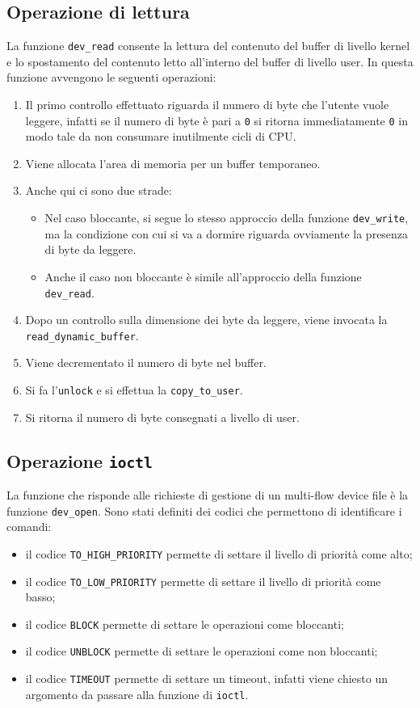 \documentclass[oneside]{article}
\begin{document}
\subsection{Operazione di lettura}
La funzione \texttt{dev\_read} consente la lettura del contenuto del buffer di livello kernel e lo spostamento del contenuto letto all'interno del buffer di livello user. In questa funzione avvengono le seguenti operazioni:
\begin{enumerate}
\item Il primo controllo effettuato riguarda il numero di byte che l'utente vuole leggere, infatti se il numero di byte è pari a \texttt{0} si ritorna immediatamente \texttt{0} in modo tale da non consumare inutilmente cicli di CPU.
\item Viene allocata l'area di memoria per un buffer temporaneo.
\item Anche qui ci sono due strade:
\begin{itemize}
\item Nel caso bloccante, si segue lo stesso approccio della funzione \texttt{dev\_write}, ma la condizione con cui si va a dormire riguarda ovviamente la presenza di byte da leggere.
\item Anche il caso non bloccante è simile all'approccio della funzione \texttt{dev\_read}.
\end{itemize}
\item Dopo un controllo sulla dimensione dei byte da leggere, viene invocata la \texttt{read\_dynamic\_buffer}.
\item Viene decrementato il numero di byte nel buffer.
\item Si fa l'\texttt{unlock} e si effettua la \texttt{copy\_to\_user}.
\item Si ritorna il numero di byte consegnati a livello di user.
\end{enumerate}

\subsection{Operazione \texttt{ioctl}}
La funzione che risponde alle richieste di gestione di un multi-flow device file è la funzione \texttt{dev\_open}. Sono stati definiti dei codici che permettono di identificare i comandi:
\begin{itemize}
\item il codice \texttt{TO\_HIGH\_PRIORITY} permette di settare il livello di priorità come alto;
\item il codice \texttt{TO\_LOW\_PRIORITY} permette di settare il livello di priorità come basso;
\item il codice \texttt{BLOCK} permette di settare le operazioni come bloccanti;
\item il codice \texttt{UNBLOCK} permette di settare le operazioni come non bloccanti;
\item il codice \texttt{TIMEOUT} permette di settare un timeout, infatti viene chiesto un argomento da passare alla funzione di \texttt{ioctl}.
\end{itemize}
\end{document}
